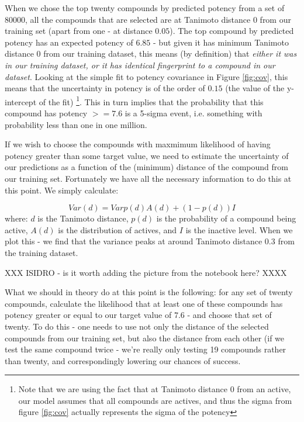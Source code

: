 \documentclass[journal=jacsat,manuscript=article]{achemso}
\begin{document}
When we chose the top twenty compounds by predicted potency from a set of $80000$, all the compounds that are selected are at Tanimoto distance 0 from our training set (apart from one - at distance $0.05$).  The top compound by predicted potency has an expected potency of $6.85$ - but given it has minimum Tanimoto distance 0 from our training dataset, this means (by definition) that \textit{either it was in our training dataset, or it has identical fingerprint to a compound in our dataset}. Looking at the simple fit to potency covariance in Figure \ref{fig:cov}, this means that the uncertainty in potency is of the order of $0.15$ (the value of the y-intercept of the fit) \footnote{Note that we are using the fact that at Tanimoto distance 0 from an active, our model assumes that all compounds are actives, and thus the sigma from figure \ref{fig:cov} actually represents the sigma of the potency}.  This in turn implies that the probability that this compound has potency $>= 7.6$ is a 5-sigma event, i.e. something with probability less than one in one million.

If we wish to choose the compounds with maxmimum likelihood of having potency greater than some target value, we need to estimate the uncertainty of our predictions as a function of the (minimum) distance of the compound from our training set.  Fortunately we have all the necessary information to do this at this point.  We simply calculate:

\begin{equation}
    Var(d) = Var{p(d)A(d) + (1-p(d))I}
\end{equation}
where: $d$ is the Tanimoto distance, $p(d)$ is the probability of a compound being active, $A(d)$ is the distribution of actives, and $I$ is the inactive level.  When we plot this - we find that the variance peaks at around Tanimoto distance $0.3$ from the training dataset.

XXX ISIDRO - is it worth adding the picture from the notebook here? XXXX

What we should in theory do at this point is the following: for any set of twenty compounds, calculate the likelihood that at least one of these compounds has potency greater or equal to our target value of $7.6$ - and choose that set of twenty.  To do this - one needs to use not only the distance of the selected compounds from our training set, but also the distance from each other (if we test the same compound twice - we're really only testing 19 compounds rather than twenty, and correspondingly lowering our chances of success.
\end{document}
